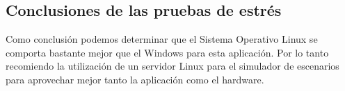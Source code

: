 \subsection{Conclusiones de las pruebas de estrés}

Como conclusión podemos determinar que el Sistema Operativo Linux se comporta bastante mejor que el Windows para esta aplicación. Por lo tanto recomiendo la utilización de un servidor Linux para el simulador de escenarios para aprovechar mejor tanto la aplicación como el hardware.